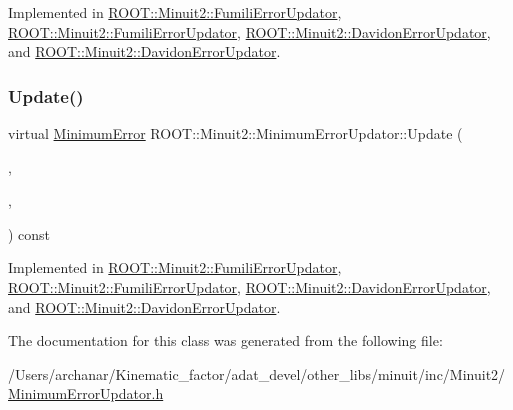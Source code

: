 Implemented in \mbox{\hyperlink{classROOT_1_1Minuit2_1_1FumiliErrorUpdator_ae5ee7f2052c474169dd19ffbc3755bd3}{R\+O\+O\+T\+::\+Minuit2\+::\+Fumili\+Error\+Updator}}, \mbox{\hyperlink{classROOT_1_1Minuit2_1_1FumiliErrorUpdator_a7a634a18816d8cdc6db8d92b27b69095}{R\+O\+O\+T\+::\+Minuit2\+::\+Fumili\+Error\+Updator}}, \mbox{\hyperlink{classROOT_1_1Minuit2_1_1DavidonErrorUpdator_afad671aa523cbd9f17af376c51c3ce97}{R\+O\+O\+T\+::\+Minuit2\+::\+Davidon\+Error\+Updator}}, and \mbox{\hyperlink{classROOT_1_1Minuit2_1_1DavidonErrorUpdator_aae088602f78dc3bee91f7ce2534311e9}{R\+O\+O\+T\+::\+Minuit2\+::\+Davidon\+Error\+Updator}}.

\mbox{\label{classROOT_1_1Minuit2_1_1MinimumErrorUpdator_ae75c33152c49ebf34e6119adc0bbbda9}} 
\subsubsection{\texorpdfstring{Update()}{Update()}\hspace{0.1cm}{\footnotesize\ttfamily [2/2]}}
{\footnotesize\ttfamily virtual \mbox{\hyperlink{classROOT_1_1Minuit2_1_1MinimumError}{Minimum\+Error}} R\+O\+O\+T\+::\+Minuit2\+::\+Minimum\+Error\+Updator\+::\+Update (\begin{DoxyParamCaption}\item[{const \mbox{\hyperlink{classROOT_1_1Minuit2_1_1MinimumState}{Minimum\+State}} \&}]{,  }\item[{const \mbox{\hyperlink{classROOT_1_1Minuit2_1_1MinimumParameters}{Minimum\+Parameters}} \&}]{,  }\item[{const \mbox{\hyperlink{classROOT_1_1Minuit2_1_1FunctionGradient}{Function\+Gradient}} \&}]{ }\end{DoxyParamCaption}) const\hspace{0.3cm}{\ttfamily [pure virtual]}}



Implemented in \mbox{\hyperlink{classROOT_1_1Minuit2_1_1FumiliErrorUpdator_ae5ee7f2052c474169dd19ffbc3755bd3}{R\+O\+O\+T\+::\+Minuit2\+::\+Fumili\+Error\+Updator}}, \mbox{\hyperlink{classROOT_1_1Minuit2_1_1FumiliErrorUpdator_a7a634a18816d8cdc6db8d92b27b69095}{R\+O\+O\+T\+::\+Minuit2\+::\+Fumili\+Error\+Updator}}, \mbox{\hyperlink{classROOT_1_1Minuit2_1_1DavidonErrorUpdator_afad671aa523cbd9f17af376c51c3ce97}{R\+O\+O\+T\+::\+Minuit2\+::\+Davidon\+Error\+Updator}}, and \mbox{\hyperlink{classROOT_1_1Minuit2_1_1DavidonErrorUpdator_aae088602f78dc3bee91f7ce2534311e9}{R\+O\+O\+T\+::\+Minuit2\+::\+Davidon\+Error\+Updator}}.



The documentation for this class was generated from the following file\+:\begin{DoxyCompactItemize}
\item 
/\+Users/archanar/\+Kinematic\+\_\+factor/adat\+\_\+devel/other\+\_\+libs/minuit/inc/\+Minuit2/\mbox{\hyperlink{other__libs_2minuit_2inc_2Minuit2_2MinimumErrorUpdator_8h}{Minimum\+Error\+Updator.\+h}}\end{DoxyCompactItemize}
